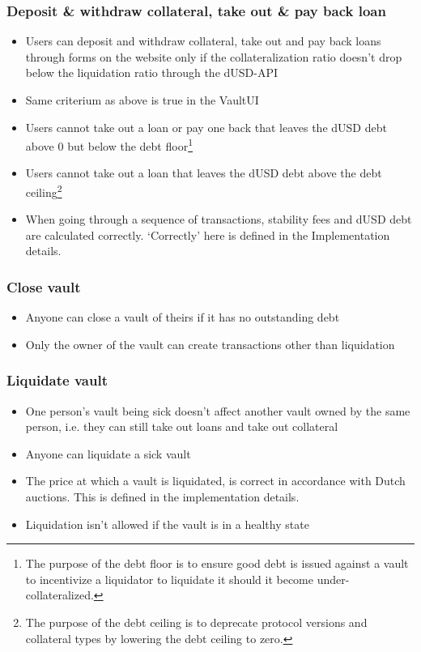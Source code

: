 \documentclass{article} %
\begin{document}
\subsubsection*{Deposit \& withdraw collateral, take out \& pay back loan}

\begin{itemize}
  \item Users can deposit and withdraw collateral, take out and pay back loans
    through forms on the website only if the collateralization ratio doesn't
    drop below the liquidation ratio through the dUSD-API
  \item Same criterium as above is true in the VaultUI
  \item Users cannot take out a loan or pay one back that leaves the dUSD debt
    above $0$ but below the debt floor\footnote{
    The purpose of the debt floor is to ensure good debt is issued against a
    vault to incentivize a liquidator to liquidate it should it become
    under-collateralized.}
  \item Users cannot take out a loan that leaves the dUSD debt above the debt
    ceiling\footnote{
    The purpose of the debt ceiling is to deprecate protocol versions and
    collateral types by lowering the debt ceiling to zero.}
  \item When going through a sequence of transactions, stability fees and dUSD
    debt are calculated correctly. `Correctly' here is defined in the
    Implementation details.
\end{itemize}

\subsubsection*{Close vault}

\begin{itemize}
  \item Anyone can close a vault of theirs if it has no outstanding debt
  \item Only the owner of the vault can create transactions other than
    liquidation
\end{itemize}

\subsubsection*{Liquidate vault}

\begin{itemize}
  \item One person's vault being sick doesn't affect another vault owned by the
    same person, i.e. they can still take out loans and take out collateral
  \item Anyone can liquidate a sick vault
  \item The price at which a vault is liquidated, is correct in accordance with
    Dutch auctions. This is defined in the implementation details.
  \item Liquidation isn't allowed if the vault is in a healthy state
\end{itemize}
\end{document}
